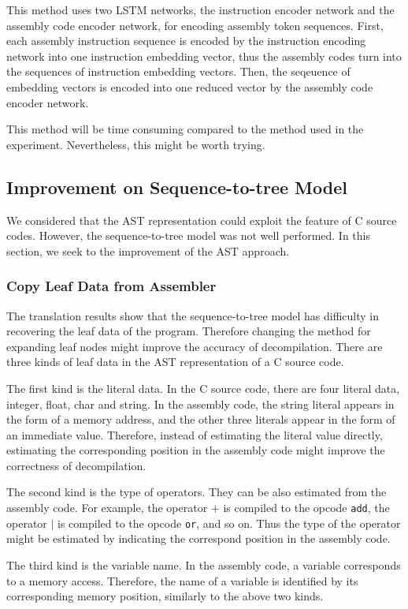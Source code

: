\documentclass[11pt]{jarticle}
\begin{document}
This method uses two LSTM networks, the instruction encoder network and the assembly code encoder network, for encoding assembly token sequences.
First, each assembly instruction sequence is encoded by the instruction encoding network into one instruction embedding vector, 
thus the assembly codes turn into the sequences of instruction embedding vectors.
Then, the seqeuence of embedding vectors is encoded into one reduced vector by the assembly code encoder network.

This method will be time consuming compared to the method used in the experiment.
Nevertheless, this might be worth trying.

\subsection{Improvement on Sequence-to-tree Model}
We considered that the AST representation could exploit the feature of C source codes. 
However, the sequence-to-tree model was not well performed.
In this section, we seek to the improvement of the AST approach.
\subsubsection{Copy Leaf Data from Assembler}
The translation results show that the sequence-to-tree model has difficulty in recovering the leaf data of the program.
Therefore changing the method for expanding leaf nodes might improve the accuracy of decompilation.
There are three kinds of leaf data in the AST representation of a C source code.

The first kind is the literal data. In the C source code, there are four literal data, integer, float, char and string. 
In the assembly code, the string literal appears in the form of a memory address, and the other three literals appear in the form of an immediate value.
Therefore, instead of estimating the literal value directly, 
estimating the corresponding position in the assembly code might improve the correctness of decompilation.

The second kind is the type of operators. They can be also estimated from the assembly code.
For example, the operator $ + $ is compiled to the opcode \texttt{add}, the operator $ | $ is compiled to the opcode \texttt{or}, and so on. 
Thus the type of the operator might be estimated by indicating the correspond position in the assembly code.

The third kind is the variable name. In the assembly code, a variable corresponds to a memory access. 
Therefore, the name of a variable is identified by its corresponding memory position, similarly to the above two kinds.
\end{document}
